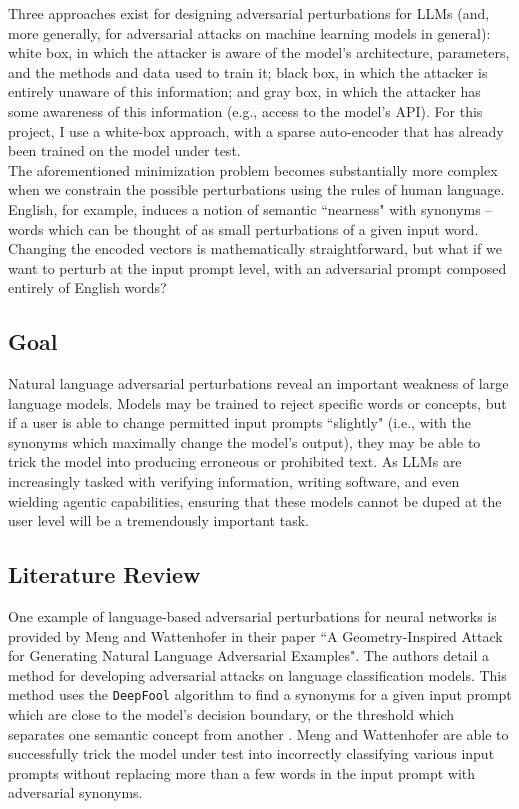 \documentclass{article}
\begin{document}
Three approaches exist for designing adversarial perturbations for LLMs (and, more generally, for adversarial attacks on machine learning models in general): white box, in which the attacker is aware of the model's architecture, parameters, and the methods and data used to train it; black box, in which the attacker is entirely unaware of this information; and gray box, in which the attacker has some awareness of this information (e.g., access to the model's API). For this project, I use a white-box approach, with a sparse auto-encoder that has already been trained on the model under test.\\

The aforementioned minimization problem becomes substantially more complex when we constrain the possible perturbations using the rules of human language. English, for example, induces a notion of semantic ``nearness" with synonyms -- words which can be thought of as small perturbations of a given input word. Changing the encoded vectors is mathematically straightforward, but what if we want to perturb at the input prompt level, with an adversarial prompt composed entirely of English words? \\

\subsection*{Goal}

Natural language adversarial perturbations reveal an important weakness of large language models. Models may be trained to reject specific words or concepts, but if a user is able to change permitted input prompts ``slightly" (i.e., with the synonyms which maximally change the model's output), they may be able to trick the model into producing erroneous or prohibited text. As LLMs are increasingly tasked with verifying information, writing software, and even wielding agentic capabilities, ensuring that these models cannot be duped at the user level will be a tremendously important task.

\subsection*{Literature Review}

One example of language-based adversarial perturbations for neural networks is provided by Meng and Wattenhofer in their paper ``A Geometry-Inspired Attack for Generating Natural Language Adversarial Examples". The authors detail a method for developing adversarial attacks on language classification models. This method uses the \texttt{DeepFool} algorithm to find a synonyms for a given input prompt which are close to the model's decision boundary, or the threshold which separates one semantic concept from another \citep{meng2020}. Meng and Wattenhofer are able to successfully trick the model under test into incorrectly classifying various input prompts without replacing more than a few words in the input prompt with adversarial synonyms. \\
\end{document}
